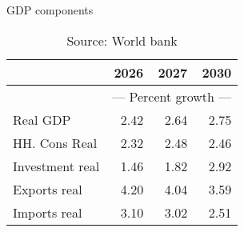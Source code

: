 \documentclass{article}
\begin{document}
\begin{table}[ht]
\caption{GDP components}
\begin{tabular}{lrrr}
\toprule
 & 2026 & 2027 & 2030 \\
\midrule
&\multicolumn{3}{c}{{---  Percent growth ---}}                \\
Real GDP & 2.42 & 2.64 & 2.75 \\
HH. Cons Real & 2.32 & 2.48 & 2.46 \\
Investment real & 1.46 & 1.82 & 2.92 \\
Exports real & 4.20 & 4.04 & 3.59 \\
Imports real & 3.10 & 3.02 & 2.51 \\
\bottomrule
\end{tabular}
\caption*{Source: World bank }
\end{table}
\end{document}
